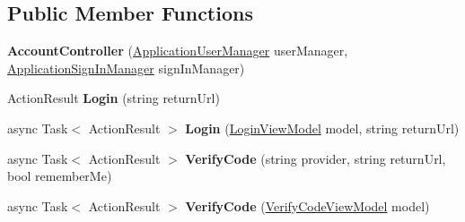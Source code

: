 \subsection*{Public Member Functions}
\begin{DoxyCompactItemize}
\item 
{\bfseries Account\+Controller} (\hyperlink{class_cloud_bread_admin_web_1_1_application_user_manager}{Application\+User\+Manager} user\+Manager, \hyperlink{class_cloud_bread_admin_web_1_1_application_sign_in_manager}{Application\+Sign\+In\+Manager} sign\+In\+Manager)\hypertarget{class_cloud_bread_admin_web_1_1_controllers_1_1_account_controller_a5985eb6e4a4ae7f4c874b1ccfba84c17}{}\label{class_cloud_bread_admin_web_1_1_controllers_1_1_account_controller_a5985eb6e4a4ae7f4c874b1ccfba84c17}

\item 
Action\+Result {\bfseries Login} (string return\+Url)\hypertarget{class_cloud_bread_admin_web_1_1_controllers_1_1_account_controller_a485bbeac01f2851f9c01803af4319301}{}\label{class_cloud_bread_admin_web_1_1_controllers_1_1_account_controller_a485bbeac01f2851f9c01803af4319301}

\item 
async Task$<$ Action\+Result $>$ {\bfseries Login} (\hyperlink{class_cloud_bread_admin_web_1_1_models_1_1_login_view_model}{Login\+View\+Model} model, string return\+Url)\hypertarget{class_cloud_bread_admin_web_1_1_controllers_1_1_account_controller_a26f5730053d2744a182135c0921104fb}{}\label{class_cloud_bread_admin_web_1_1_controllers_1_1_account_controller_a26f5730053d2744a182135c0921104fb}

\item 
async Task$<$ Action\+Result $>$ {\bfseries Verify\+Code} (string provider, string return\+Url, bool remember\+Me)\hypertarget{class_cloud_bread_admin_web_1_1_controllers_1_1_account_controller_a3aec70c240231aa01c2382636508129d}{}\label{class_cloud_bread_admin_web_1_1_controllers_1_1_account_controller_a3aec70c240231aa01c2382636508129d}

\item 
async Task$<$ Action\+Result $>$ {\bfseries Verify\+Code} (\hyperlink{class_cloud_bread_admin_web_1_1_models_1_1_verify_code_view_model}{Verify\+Code\+View\+Model} model)\hypertarget{class_cloud_bread_admin_web_1_1_controllers_1_1_account_controller_a039a7401f9ec43263c2bc04509244fce}{}\label{class_cloud_bread_admin_web_1_1_controllers_1_1_account_controller_a039a7401f9ec43263c2bc04509244fce}


\end{DoxyCompactItemize}
